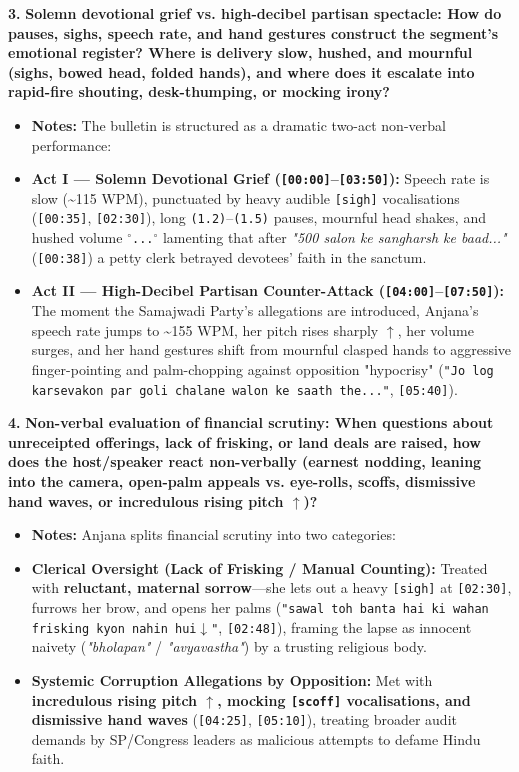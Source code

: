 \documentclass[10pt,a4paper]{article}
\begin{document}
\noindent\textbf{3.} \textbf{Solemn devotional grief vs. high-decibel partisan spectacle: How do pauses, sighs, speech rate, and hand gestures construct the segment's emotional register? Where is delivery slow, hushed, and mournful (sighs, bowed head, folded hands), and where does it escalate into rapid-fire shouting, desk-thumping, or mocking irony?}\par\smallskip
\begin{itemize}
  \item \textbf{Notes:}
The bulletin is structured as a dramatic two-act non-verbal performance:\par\smallskip
  \item \textbf{Act I --- Solemn Devotional Grief (\texttt{[00:00]}--\texttt{[03:50]}):} Speech rate is slow (\textasciitilde{}115 WPM), punctuated by heavy audible \texttt{[sigh]} vocalisations (\texttt{[00:35]}, \texttt{[02:30]}), long \texttt{(1.2)}--\texttt{(1.5)} pauses, mournful head shakes, and hushed volume \texttt{$^\circ$...$^\circ$} lamenting that after \textit{"500 salon ke sangharsh ke baad..."} (\texttt{[00:38]}) a petty clerk betrayed devotees' faith in the sanctum.
  \item \textbf{Act II --- High-Decibel Partisan Counter-Attack (\texttt{[04:00]}--\texttt{[07:50]}):} The moment the Samajwadi Party's allegations are introduced, Anjana's speech rate jumps to \textasciitilde{}155 WPM, her pitch rises sharply \texttt{$\uparrow$}, her volume surges, and her hand gestures shift from mournful clasped hands to aggressive finger-pointing and palm-chopping against opposition "hypocrisy" (\texttt{"Jo log karsevakon par goli chalane walon ke saath the..."}, \texttt{[05:40]}).
\end{itemize}

\noindent\textbf{4.} \textbf{Non-verbal evaluation of financial scrutiny: When questions about unreceipted offerings, lack of frisking, or land deals are raised, how does the host/speaker react non-verbally (earnest nodding, leaning into the camera, open-palm appeals vs. eye-rolls, scoffs, dismissive hand waves, or incredulous rising pitch $\uparrow$)?}\par\smallskip
\begin{itemize}
  \item \textbf{Notes:}
Anjana splits financial scrutiny into two categories:\par\smallskip
  \item \textbf{Clerical Oversight (Lack of Frisking / Manual Counting):} Treated with \textbf{reluctant, maternal sorrow}---she lets out a heavy \texttt{[sigh]} at \texttt{[02:30]}, furrows her brow, and opens her palms (\texttt{"sawal toh banta hai ki wahan frisking kyon nahin hui$\downarrow$"}, \texttt{[02:48]}), framing the lapse as innocent naivety (\textit{"bholapan"} / \textit{"avyavastha"}) by a trusting religious body.
  \item \textbf{Systemic Corruption Allegations by Opposition:} Met with \textbf{incredulous rising pitch \texttt{$\uparrow$}, mocking \texttt{[scoff]} vocalisations, and dismissive hand waves} (\texttt{[04:25]}, \texttt{[05:10]}), treating broader audit demands by SP/Congress leaders as malicious attempts to defame Hindu faith.
\end{itemize}
\end{document}
